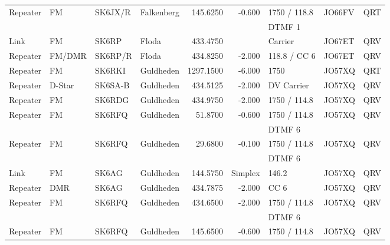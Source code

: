 \begin{landscape}
\begin{longtable}{llllrrlll}
Repeater & FM        & SK6JX/R  & Falkenberg        & 145.6250     & -0.600     & 1750 / 118.8 & JO66FV      & QRT      \\
         &           &          &                   &              &            & DTMF 1       &             &          \\
Link     & FM        & SK6RP    & Floda             & 433.4750     &            & Carrier      & JO67ET      & QRV      \\
Repeater & FM/DMR    & SK6RP/R  & Floda             & 434.8250     & -2.000     & 118.8 / CC 6 & JO67ET      & QRV      \\
Repeater & FM        & SK6RKI   & Guldheden         & 1297.1500    & -6.000     & 1750         & JO57XQ      & QRT      \\
Repeater & D-Star    & SK6SA-B  & Guldheden         & 434.5125     & -2.000     & DV Carrier   & JO57XQ      & QRV      \\
Repeater & FM        & SK6RDG   & Guldheden         & 434.9750     & -2.000     & 1750 / 114.8 & JO57XQ      & QRV      \\
Repeater & FM        & SK6RFQ   & Guldheden         & 51.8700      & -0.600     & 1750 / 114.8 & JO57XQ      & QRV      \\
         &           &          &                   &              &            & DTMF 6       &             &          \\
Repeater & FM        & SK6RFQ   & Guldheden         & 29.6800      & -0.100     & 1750 / 114.8 & JO57XQ      & QRV      \\
         &           &          &                   &              &            & DTMF 6       &             &          \\
Link     & FM        & SK6AG    & Guldheden         & 144.5750     & Simplex    & 146.2        & JO57XQ      & QRV      \\
Repeater & DMR       & SK6AG    & Guldheden         & 434.7875     & -2.000     & CC 6         & JO57XQ      & QRV      \\
Repeater & FM        & SK6RFQ   & Guldheden         & 434.6500     & -2.000     & 1750 / 114.8 & JO57XQ      & QRV      \\
         &           &          &                   &              &            & DTMF 6       &             &          \\
Repeater & FM        & SK6RFQ   & Guldheden         & 145.6500     & -0.600     & 1750 / 114.8 & JO57XQ      & QRV      \\

\end{longtable}
\end{landscape}
